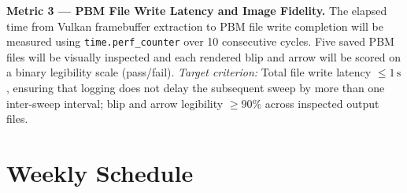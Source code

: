 \documentclass[14pt]{article}
\begin{document}
\textbf{Metric 3 --- PBM File Write Latency and Image Fidelity.}
The elapsed time from Vulkan framebuffer extraction to PBM file write
completion will be measured using \texttt{time.perf\_counter} over 10
consecutive cycles. Five saved PBM files will be visually inspected and each
rendered blip and arrow will be scored on a binary legibility scale
(pass/fail).
\textit{Target criterion:} Total file write latency $\leq 1\,\text{s}$,
ensuring that logging does not delay the subsequent sweep by more than one
inter-sweep interval; blip and arrow legibility $\geq 90\%$ across inspected
output files.

\section{Weekly Schedule}
\end{document}
